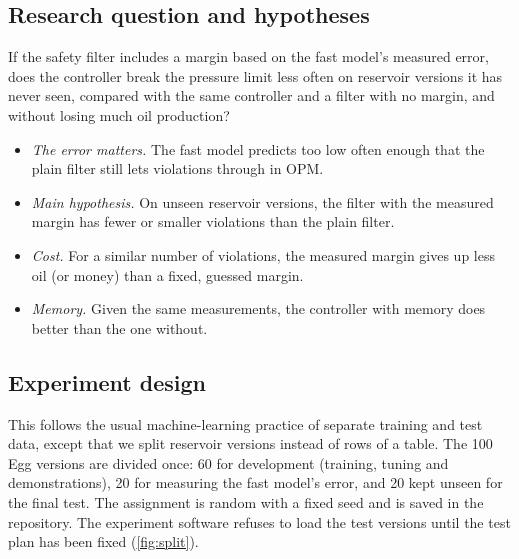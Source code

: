 \documentclass[11pt,letterpaper]{article}
\begin{document}
\subsection{Research question and hypotheses}

\begin{keybox}[title=Research question.]
If the safety filter includes a margin based on the fast model's measured error, does the
controller break the pressure limit less often on reservoir versions it has never seen,
compared with the same controller and a filter with no margin, and without losing much
oil production?
\end{keybox}

\begin{itemize}
\item[H1] \emph{The error matters.} The fast model predicts too low often enough that the plain filter still lets violations through in OPM.
\item[H2] \emph{Main hypothesis.} On unseen reservoir versions, the filter with the measured margin has fewer or smaller violations than the plain filter.
\item[H3] \emph{Cost.} For a similar number of violations, the measured margin gives up less oil (or money) than a fixed, guessed margin.
\item[H4] \emph{Memory.} Given the same measurements, the controller with memory does better than the one without.
\end{itemize}

\subsection{Experiment design}

This follows the usual machine-learning practice of separate training and test data, except
that we split reservoir versions instead of rows of a table. The 100 Egg versions are
divided once: 60 for development (training, tuning and demonstrations), 20 for measuring
the fast model's error, and 20 kept unseen for the final test. The assignment is random
with a fixed seed and is saved in the repository. The experiment software refuses to load
the test versions until the test plan has been fixed (\cref{fig:split}).
\end{document}
